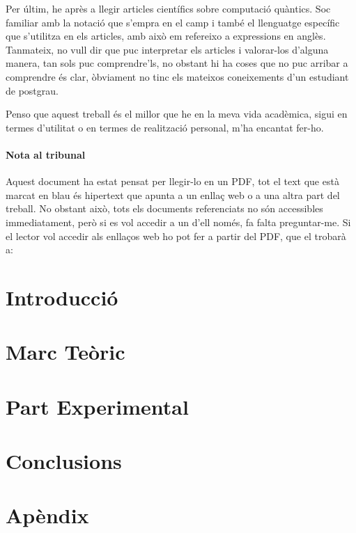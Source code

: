 \documentclass[a4paper,12pt,arial,numbered,print,index,oneside]{book}
\newcommand\blankpage{%
	\null
	\thispagestyle{empty}%
	\addtocounter{page}{-1}%
	\newpage}
\begin{document}
	Per últim, he après a llegir articles científics sobre computació quàntics. Soc familiar amb la notació que s'empra en el camp i també el llenguatge específic que s'utilitza en els articles, amb això em refereixo a expressions en anglès. Tanmateix, no vull dir que puc interpretar els articles i valorar-los d'alguna manera, tan sols puc comprendre'ls, no obstant hi ha coses que no puc arribar a comprendre és clar, òbviament no tinc els mateixos coneixements d'un estudiant de postgrau.
	
	
	Penso que aquest treball és el millor que he en la meva vida acadèmica, sigui en termes d'utilitat o en termes de realització personal, m'ha encantat fer-ho.
	
	\subsection{Nota al tribunal}
	Aquest document ha estat pensat per llegir-lo en un PDF, tot el text que està marcat en blau és hipertext que apunta a un enllaç web o a una altra part del treball. No obstant això, tots els documents referenciats no són accessibles immediatament, però si es vol accedir a un d'ell només, fa falta preguntar-me. Si el lector vol accedir als enllaços web ho pot fer a partir del PDF, que el trobarà a: \href{https://github.com/tomiock/qGAN}
	
	
	\afterpage{\blankpage}
	
	\part*{Introducció}
	\label{part:intro}
	
	
	\part{Marc Teòric}
	\label{part:theoretical_framework}
	
	
	\part{Part Experimental}
	\label{part:experimental_work}
	
	
	\part{Conclusions}
	\label{part:conclusions}
	
	
	\printglossaries
	
	\part{Apèndix}
	\begin{appendices}
		
	\end{appendices}

	
	
	
\end{document}
